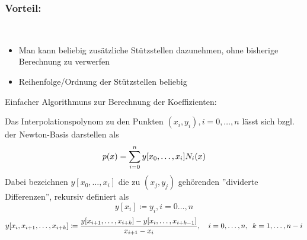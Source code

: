 \documentclass[../Skript.tex]{subfiles}
\begin{document}
\subsubsection*{Vorteil:}\hfill\\
\begin{itemize}
    \item Man kann beliebig zusätzliche Stützstellen dazunehmen, ohne bisherige Berechnung zu verwerfen
    \item Reihenfolge/Ordnung der Stützstellen beliebig
\end{itemize}
Einfacher Algorithmuns zur Berechnung der Koeffizienten: 
\begin{theorem}
    Das Interpolationspolynom zu den Punkten $(x_i, y_i), i=0,\dots,n$ lässt sich bzgl. der Newton-Basis
    darstellen als \[
        p(x) = \displaystyle\sum_{i=0}^n y[x_0, \dots, x_i]N_i(x)
    \]
    Dabei bezeichnen $y[x_0, \dots, x_i]$ die zu $(x_j, y_j)$ gehörenden ''dividerte Differenzen'', rekursiv 
    definiert als \[
    y[x_i] \coloneqq y_i, i=0\dots,n
    \]
    \[
    y[x_i, x_{i+1}, \dots, x_{i+k}] \coloneqq \frac{y[x_{i+1}, \dots, x_{i+k}] - y[x_i, \dots, x_{i+k-1}]}{x_{i+1} - x_i}, 
    \quad i=0, \dots, n, \hspace{.5em} k=1, \dots, n-i
    \]
\end{theorem}
\end{document}

